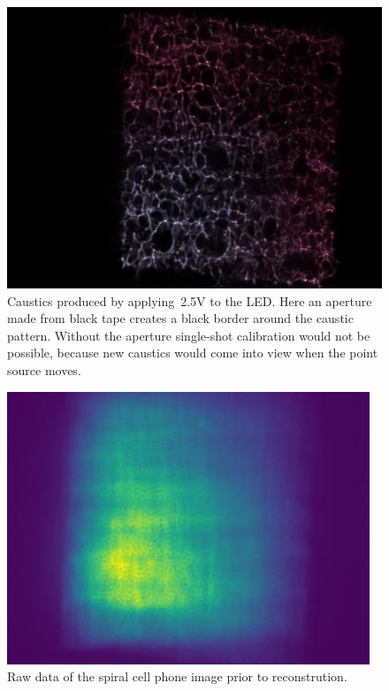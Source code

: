 \documentclass[final]{cvpr}
\begin{document}
\begin{figure}[t]
	\centering
	\includegraphics[width=1.0\linewidth]{images/caustic-with-aperture}
	\caption{\label{fig:caustic-with-aperture}
		Caustics produced by applying~\num{2.5}V to the LED\@.
		Here an aperture made from black tape creates a black border
		around the caustic pattern.
		Without the aperture single-shot calibration would not be
		possible, because new caustics would come into view when the
		point source moves.}
\end{figure}


\begin{figure}[t]
	\centering
	\includegraphics[width=1.0\linewidth]{images/raw-data-spiral}
	\caption{\label{fig:raw-data-spiral}Raw data of the spiral cell phone
		image prior to reconstrution.}
\end{figure}
\end{document}
